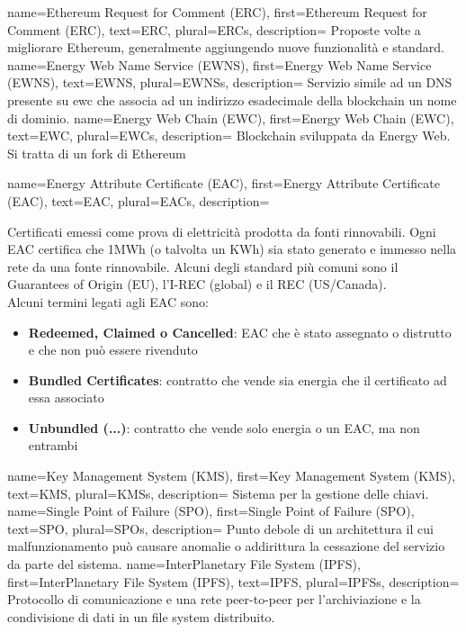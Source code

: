 {
    name={Ethereum Request for Comment (ERC)},
    first={Ethereum Request for Comment (ERC)},
    text={ERC},
    plural={ERCs},
    description={ 
        Proposte volte a migliorare Ethereum, generalmente aggiungendo nuove funzionalità e standard. 
    }
}
{
    name={Energy Web Name Service (EWNS)},
    first={Energy Web Name Service (EWNS)},
    text={EWNS},
    plural={EWNSs},
    description={ 
        Servizio simile ad un DNS presente su \gls{ewc} che associa ad un indirizzo esadecimale della blockchain un nome di dominio. 
    }
}
{
    name={Energy Web Chain (EWC)},
    first={Energy Web Chain (EWC)},
    text={EWC},
    plural={EWCs},
    description={ 
        Blockchain sviluppata da Energy Web. Si tratta di un fork di Ethereum 
    }
}
{
    name={Energy Attribute Certificate (EAC)},
    first={Energy Attribute Certificate (EAC)},
    text={EAC},
    plural={EACs},
    description={ 
        Certificati emessi come prova di elettricità prodotta da fonti rinnovabili. 
        Ogni EAC certifica che 1MWh (o talvolta un KWh) sia stato generato e immesso nella rete da una fonte rinnovabile. 
        Alcuni degli standard più comuni sono il Guarantees of Origin (EU), l'I-REC (global) e il REC (US/Canada). \\
        Alcuni termini legati agli EAC sono:
        \begin{itemize}
            \item \textbf{Redeemed, Claimed o Cancelled}: EAC che è stato assegnato o distrutto e che non può essere rivenduto
            \item \textbf{Bundled Certificates}: contratto che vende sia energia che il certificato ad essa associato
            \item \textbf{Unbundled (...)}: contratto che vende solo energia o un EAC, ma non entrambi
        \end{itemize}
    }
}
{
    name={Key Management System (KMS)},
    first={Key Management System (KMS)},
    text={KMS},
    plural={KMSs},
    description={ 
        Sistema per la gestione delle chiavi. 
    }
}
{
    name={Single Point of Failure (SPO)},
    first={Single Point of Failure (SPO)},
    text={SPO},
    plural={SPOs},
    description={ 
        Punto debole di un architettura il cui malfunzionamento può causare anomalie o addirittura la cessazione del servizio da parte del sistema. 
    }
}
{
    name={InterPlanetary File System (IPFS)},
    first={InterPlanetary File System (IPFS)},
    text={IPFS},
    plural={IPFSs},
    description={ 
        Protocollo di comunicazione e una rete peer-to-peer per l'archiviazione e la condivisione di dati in un file system distribuito. 
    }
}
